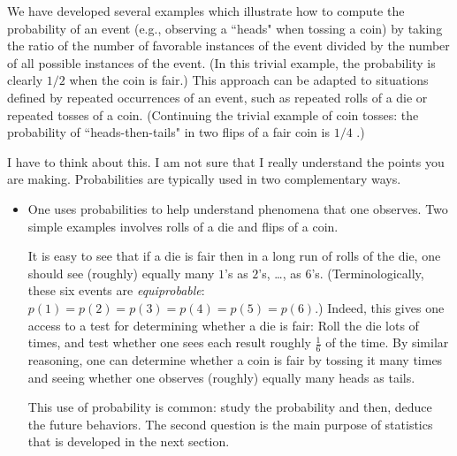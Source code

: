 \bigskip


We have developed several examples which illustrate how to compute the probability of an event
(e.g., observing a ``heads" when tossing a coin) by taking the ratio of the number of favorable 
instances of the event divided by the number of all possible instances of the event.  (In this trivial
example, the probability is clearly $1/2$ when the coin is fair.)  This approach can be adapted to
situations defined by repeated occurrences of an event, such as repeated rolls of a  die or 
repeated tosses of a coin.  (Continuing the trivial example of coin tosses: the probability of 
``heads-then-tails" in two flips of a fair coin is $1/4$ .)

\bigskip

{\Arny I have to think about this.  I am not sure that I really understand the points you are making.}
Probabilities are typically used in two complementary ways.
\begin{itemize}
\item
One uses probabilities to help understand phenomena that one observes.  Two simple examples involves
rolls of a die and flips of a coin.  
It is easy to see that if a die is fair then in a long run of rolls of the die, one should see (roughly) equally
many $1$'s as $2$'s, \ldots, as $6$'s.  (Terminologically, these six events are \textit{equiprobable}:
$p(1)=p(2)=p(3)=p(4)=p(5)=p(6)$.) Indeed, this gives one access to a test for determining whether a die
is fair: Roll the die lots of times, and test whether one sees each result roughly $\frac{1}{6}$ of the time.
By similar reasoning, one can determine whether a coin is fair by tossing it many times and seeing 
whether one observes (roughly) equally many {\sc head}s as {\sc tail}s.

This use of probability is common: study the probability and then, deduce the future behaviors.
The second question is the main purpose of statistics that is developed in the next section.

\end{itemize}

